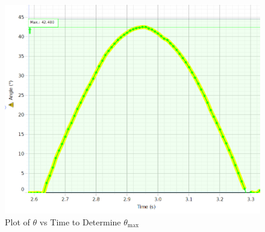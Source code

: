 \documentclass[12pt]{article}
\begin{document}
        \begin{figure}[H]
            \centering
            \includegraphics[width=\textwidth]{thetamax.png}
            \caption{Plot of \(\theta\) vs Time to Determine \(\theta_{\mathrm{max}}\)}
        \end{figure}
\end{document}
